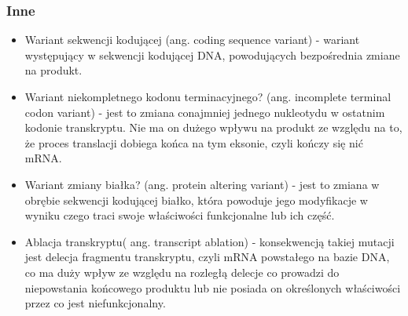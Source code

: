 \documentclass[12pt]{article}
\begin{document}
\subsubsection{Inne}
\begin{itemize}
	\item Wariant sekwencji kodującej (ang. coding sequence variant) - wariant występujący w sekwencji kodującej DNA, powodujących bezpośrednia zmiane na produkt. 
	\item Wariant niekompletnego kodonu terminacyjnego? (ang. incomplete terminal codon variant) - jest to zmiana conajmniej jednego nukleotydu w ostatnim kodonie transkryptu. Nie ma on dużego wpływu na produkt ze względu na to, że proces translacji dobiega końca na tym eksonie, czyli kończy się nić mRNA.
	\item Wariant zmiany białka? (ang. protein altering variant) - jest to zmiana w obrębie sekwencji kodującej białko, która powoduje jego modyfikacje w wyniku czego traci swoje właściwości funkcjonalne lub ich część.
	\item Ablacja transkryptu( ang. transcript ablation) - konsekwencją takiej mutacji jest delecja fragmentu transkryptu, czyli mRNA powstałego na bazie DNA, co ma duży wpływ ze względu na rozległą delecje co prowadzi do niepowstania końcowego produktu lub nie posiada on określonych właściwości przez co jest niefunkcjonalny.
\end{itemize}

\newpage
\end{document}
